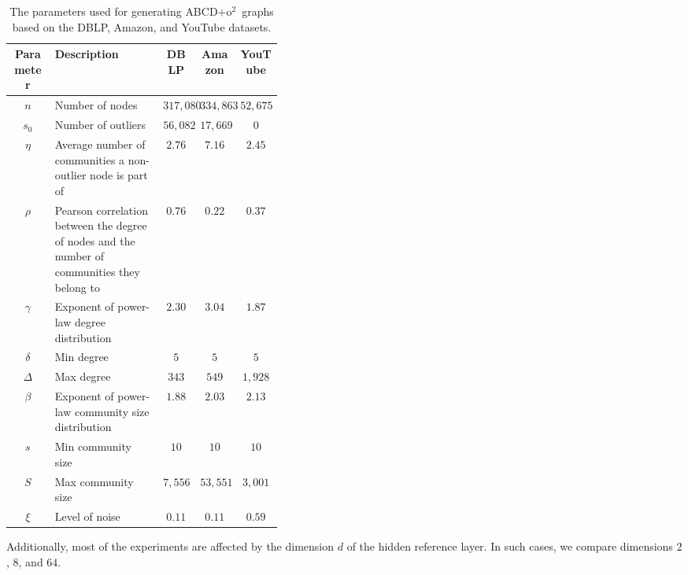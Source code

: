 \documentclass[review,los,12pt]{ryethesis}
\newcommand{\abcdoo}{{ABCD+o$^2$}}
\begin{document}
\begin{table}
    \centering
    \begin{tabular}{|c|p{0.4\linewidth}|c|c|c|}
        \hline
         Parameter & Description & DBLP & Amazon & YouTube \\ \hline
         $n$ & Number of nodes & $317{,}080$ & $334{,}863$ & $52{,}675$ \\
         $s_0$ & Number of outliers & $56{,}082$ & $17{,}669$ & $0$ \\
         $\eta$ & Average number of communities a non-outlier node is part of & $2.76$ & $7.16$ & $2.45$ \\
         $\rho$ & Pearson correlation between the degree of nodes and the number of communities they belong to & $0.76$ & $0.22$ & $0.37$ \\ \hline
         $\gamma$ & Exponent of power-law degree distribution & $2.30$ & $3.04$ & $1.87$ \\
         $\delta$ & Min degree & $5$ & $5$ & $5$ \\
         $\Delta$ & Max degree & $343$ & $549$ & $1{,}928$\\
         \hline
         $\beta$ & Exponent of power-law community size distribution& $1.88$ & $2.03$ & $2.13$\\
         $s$ & Min community size & $10$ & $10$ & $10$\\
         $S$ & Max community size & $7{,}556$ & $53{,}551$ & $3{,}001$ \\
         \hline
         $\xi$ & Level of noise & $0.11$ & $0.11$ & $0.59$ \\ \hline
    \end{tabular}
    \medskip
    \caption{The parameters used for generating \abcdoo\ graphs based on the DBLP, Amazon, and YouTube datasets.}
    \label{tab:real_graph_params}
\end{table}
Additionally, most of the experiments are affected by the dimension $d$ of the hidden reference layer. In such cases, we compare dimensions $2$, $8$, and $64$. 
\end{document}
